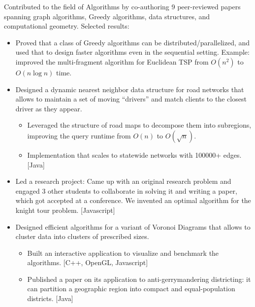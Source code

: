 \documentclass[letterpaper,10pt,oneside]{article}
\begin{document}
\vspace{2px}
\noindent Contributed to the field of Algorithms by co-authoring 9 peer-reviewed papers spanning graph algorithms, Greedy algorithms, data structures, and computational geometry. Selected results:
\begin{itemize}[leftmargin=15px]
	\item Proved that a class of Greedy algorithms can be distributed/parallelized, and used that to design faster algorithms even in the sequential setting. Example: improved the multi-fragment algorithm for Euclidean TSP from $O(n^2)$ to $O(n\log n)$ time.
	\item Designed a dynamic nearest neighbor data structure for road networks that allows to maintain a set of moving  ``drivers'' and match clients to the closest driver as they appear.
	\begin{itemize}[leftmargin=15px,topsep=0px]
		\item Leveraged the structure of road maps to decompose them into subregions, improving the query runtime from $O(n)$ to $O(\sqrt{n})$.
		\item Implementation that scales to statewide networks with 100000+ edges. [Java]   
	\end{itemize}
	\item Led a research project: Came up with an original research problem and engaged 3 other students to collaborate in solving it and writing a paper, which got accepted at a conference. We invented an optimal algorithm for the knight tour problem. [Javascript]
	\item Designed efficient algorithms for a variant of Voronoi Diagrams that allows to cluster data into clusters of prescribed sizes.
	\begin{itemize}[leftmargin=15px,topsep=0px]
		\item Built an interactive application to visualize and benchmark the algorithms. [C++, OpenGL, Javascript]
		\item Published a paper on its application to anti-gerrymandering districting: it can partition a geographic region into compact and equal-population districts. [Java]
	\end{itemize}
\end{itemize}
\end{document}
